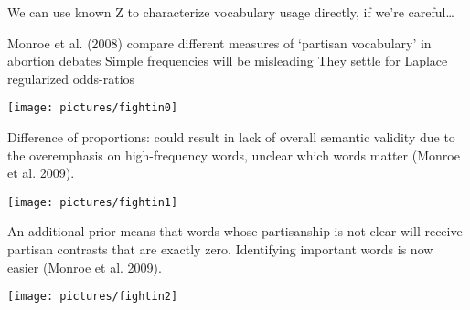 \documentclass[kp]{foilpack}
\begin{document}
We can use known Z to characterize vocabulary usage directly, if we're careful\ldots

Monroe et al. (2008) compare different measures of `partisan vocabulary' in abortion debates
\ita
\itm Simple frequencies will be misleading
\itm They settle for Laplace regularized odds-ratios
\itz

\newpage


\centerline{\texttt{[image: pictures/fightin0]}}

{\footnotesize Difference of proportions: could result in lack of overall semantic validity due to the overemphasis on high-frequency words, unclear which words matter (Monroe et al. 2009).}

\newpage
\centerline{\texttt{[image: pictures/fightin1]}}

{\footnotesize An additional prior means that words whose partisanship is not clear will receive partisan contrasts that are exactly zero. Identifying important words is now easier (Monroe et al. 2009).} 


\centerline{\texttt{[image: pictures/fightin2]}}
\end{document}
